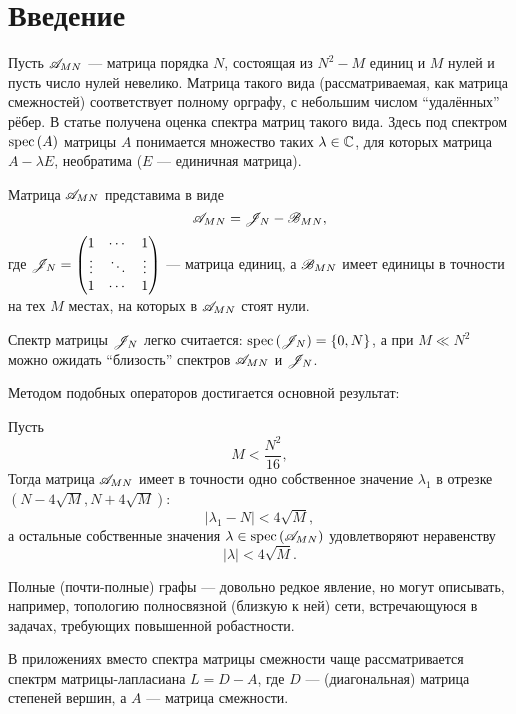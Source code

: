\section{Введение}

Пусть \( \mathscr{A}_{{M}{N}} \) --- матрица порядка \( N \),
состоящая из \( N^2 - M \) единиц и \( M \) нулей
и пусть число нулей невелико.
Матрица такого вида (рассматриваемая, как матрица смежностей) соответствует
полному орграфу, с небольшим числом ``удалённых'' рёбер.
В статье получена оценка спектра
матриц такого вида.
Здесь под спектром \( \mathrm{spec}\left({A}\right) \) матрицы \( A \)
понимается множество таких \( \lambda\in\mathbb{C} \), для которых
матрица \( A - \lambda E \), необратима (\( E \) --- единичная матрица).

Матрица \( \mathscr{A}_{{M}{N}} \) представима в виде
\[
    \mathscr{A}_{{M}{N}} = \mathscr{J}_{N} - \mathscr{B}_{{M}{N}},
    \]
где \(
\mathscr{J}_{N} =
\begin{pmatrix}1 & \cdots & 1 \\
\vdots & \ddots & \vdots \\
1 & \cdots & 1
\end{pmatrix} \) --- матрица единиц,
а \( \mathscr{B}_{{M}{N}} \) имеет единицы в точности на тех \( M \)
местах, на которых в \( \mathscr{A}_{{M}{N}} \) стоят нули.

Спектр матрицы \( \mathscr{J}_{N} \) легко считается:
\( \mathrm{spec}\left({\mathscr{J}_{N}}\right) = \left\{0, N \right\} \),
а при \( M \ll N^2 \) можно ожидать ``близость'' спектров
\( \mathscr{A}_{{M}{N}} \) и \( \mathscr{J}_{N} \).

Методом подобных операторов \cite{baskakov-harmonic}
достигается основной результат:
\begin{thm}\label{thm:almostallones-spectra}
Пусть
\[ M < \frac{N^2}{16}, \]
Тогда матрица \( \mathscr{A}_{{M}{N}} \) имеет в точности
одно собственное значение \( \lambda_1 \) в отрезке \( ( N-4\sqrt{M}, N+4\sqrt{M} ) \):
\[ \lvert \lambda_1 - N \rvert < 4\sqrt{M}, \]
а остальные собственные значения \( \lambda\in\mathrm{spec}\left({\mathscr{A}_{{M}{N}}}\right) \) удовлетворяют неравенству
\[ \lvert \lambda \rvert < 4\sqrt{M}. \]
\end{thm}

Полные (почти-полные) графы --- довольно редкое явление,
но могут описывать, например, топологию полносвязной (близкую к ней) сети,
встречающуюся в задачах, требующих повышенной робастности.

В приложениях вместо спектра матрицы смежности чаще рассматривается
спектрм матрицы-лапласиана \( L = D - A \),
где \( D \) --- (диагональная) матрица степеней вершин,
а \( A \) --- матрица смежности.

